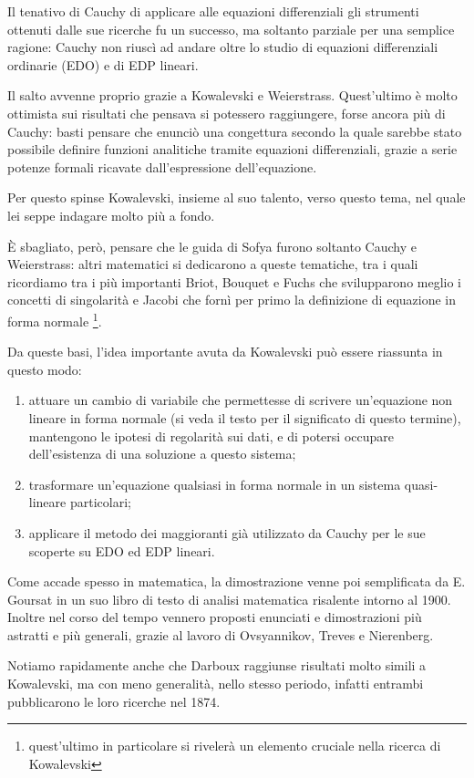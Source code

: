 Il tenativo di Cauchy di applicare alle equazioni differenziali gli strumenti ottenuti dalle sue ricerche fu un successo, ma soltanto parziale per una semplice ragione: Cauchy non riuscì ad andare oltre lo studio di equazioni differenziali ordinarie (EDO) e di EDP lineari. 

Il salto avvenne proprio grazie a Kowalevski e Weierstrass. Quest'ultimo è molto ottimista sui risultati che pensava si potessero raggiungere, forse ancora più di Cauchy: basti pensare che enunciò una congettura secondo la quale sarebbe stato possibile definire funzioni analitiche tramite equazioni differenziali, grazie a serie potenze formali ricavate dall'espressione dell'equazione.

Per questo spinse Kowalevski, insieme al suo talento, verso questo tema, nel quale lei seppe indagare molto più a fondo.

È sbagliato, però, pensare che le guida di Sofya furono soltanto Cauchy e Weierstrass: altri matematici si dedicarono a queste tematiche, tra i quali ricordiamo tra i più importanti Briot, Bouquet e Fuchs che svilupparono meglio i concetti di singolarità e Jacobi che fornì per primo la definizione di equazione in forma normale
\footnote{quest'ultimo in particolare si rivelerà un elemento cruciale nella ricerca di Kowalevski}.

Da queste basi, l’idea importante avuta da Kowalevski può essere riassunta in questo modo: 
\begin{enumerate}
\item attuare un cambio di variabile che permettesse di scrivere un'equazione non lineare in forma normale (si veda il testo per il significato di questo termine), mantengono le ipotesi di regolarità sui dati, e di potersi occupare dell’esistenza di una soluzione a questo sistema;
\item trasformare un'equazione qualsiasi in forma normale in un sistema quasi-lineare particolari;
\item applicare il metodo dei maggioranti già utilizzato da Cauchy per le sue scoperte su EDO ed EDP lineari.
\end{enumerate}
Come accade spesso in matematica, la dimostrazione venne poi semplificata da E. Goursat in un suo libro di testo di analisi matematica risalente intorno al 1900. Inoltre nel corso del tempo vennero proposti enunciati e dimostrazioni più astratti e più generali, grazie al lavoro di Ovsyannikov, Treves e Nierenberg.

Notiamo rapidamente anche che Darboux raggiunse risultati molto simili a Kowalevski, ma con meno generalità, nello stesso periodo, infatti entrambi pubblicarono le loro ricerche nel 1874.

